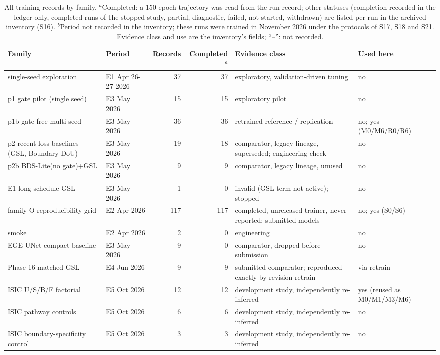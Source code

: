 \begin{longtable}{@{}p{3.6cm}p{1.9cm}rrp{3.4cm}p{1.9cm}@{}}
\caption{\label{tab:inventory}All training records by family. $^{a}$Completed: a 150-epoch trajectory was read from the run record; other statuses (completion recorded in the ledger only, completed runs of the stopped study, partial, diagnostic, failed, not started, withdrawn) are listed per run in the archived inventory (S16). $^{b}$Period not recorded in the inventory; these runs were trained in November 2026 under the protocols of S17, S18 and S21. Evidence class and use are the inventory's fields; ``--'': not recorded.}\\
\toprule
Family & Period & Records & Completed$^{a}$ & Evidence class & Used here \\
\midrule
\endhead
single-seed exploration & E1 Apr 26-27 2026 & 37 & 37 & exploratory, validation-driven tuning & no \\
p1 gate pilot (single seed) & E3 May 2026 & 15 & 15 & exploratory pilot & no \\
p1b gate-free multi-seed & E3 May 2026 & 36 & 36 & retrained reference / replication & no; yes (M0/M6/R0/R6) \\
p2 recent-loss baselines (GSL, Boundary DoU) & E3 May 2026 & 19 & 18 & comparator, legacy lineage, superseded; engineering check & no \\
p2b BDS-Lite(no gate)+GSL & E3 May 2026 & 9 & 9 & comparator, legacy lineage, unused & no \\
E1 long-schedule GSL & E3 May 2026 & 1 & 0 & invalid (GSL term not active); stopped & no \\
family O reproducibility grid & E2 Apr 2026 & 117 & 117 & completed, unreleased trainer, never reported; submitted models & no; yes (S0/S6) \\
smoke & E2 Apr 2026 & 2 & 0 & engineering & no \\
EGE-UNet compact baseline & E3 May 2026 & 9 & 0 & comparator, dropped before submission & no \\
Phase 16 matched GSL & E4 Jun 2026 & 9 & 9 & submitted comparator; reproduced exactly by revision retrain & via retrain \\
ISIC U/S/B/F factorial & E5 Oct 2026 & 12 & 12 & development study, independently re-inferred & yes (reused as M0/M1/M3/M6) \\
ISIC pathway controls & E5 Oct 2026 & 6 & 6 & development study, independently re-inferred & no \\
ISIC boundary-specificity control & E5 Oct 2026 & 3 & 3 & development study, independently re-inferred & no \\

\end{longtable}

